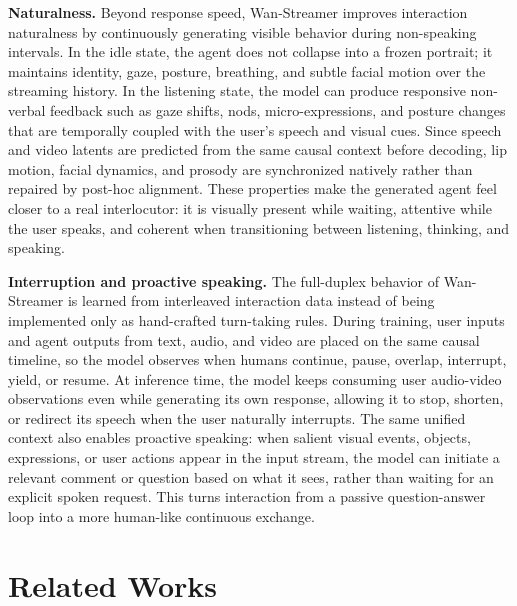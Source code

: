 \documentclass{llmxive}
\providecommand{\model}{Wan-Streamer\xspace}
\begin{document}
\textbf{Naturalness.}
Beyond response speed, \model improves interaction naturalness by continuously generating visible behavior during non-speaking intervals. In the idle state, the agent does not collapse into a frozen portrait; it maintains identity, gaze, posture, breathing, and subtle facial motion over the streaming history. In the listening state, the model can produce responsive non-verbal feedback such as gaze shifts, nods, micro-expressions, and posture changes that are temporally coupled with the user's speech and visual cues. Since speech and video latents are predicted from the same causal context before decoding, lip motion, facial dynamics, and prosody are synchronized natively rather than repaired by post-hoc alignment. These properties make the generated agent feel closer to a real interlocutor: it is visually present while waiting, attentive while the user speaks, and coherent when transitioning between listening, thinking, and speaking.

\textbf{Interruption and proactive speaking.}
The full-duplex behavior of \model is learned from interleaved interaction data instead of being implemented only as hand-crafted turn-taking rules. During training, user inputs and agent outputs from text, audio, and video are placed on the same causal timeline, so the model observes when humans continue, pause, overlap, interrupt, yield, or resume. At inference time, the model keeps consuming user audio-video observations even while generating its own response, allowing it to stop, shorten, or redirect its speech when the user naturally interrupts. The same unified context also enables proactive speaking: when salient visual events, objects, expressions, or user actions appear in the input stream, the model can initiate a relevant comment or question based on what it sees, rather than waiting for an explicit spoken request. This turns interaction from a passive question-answer loop into a more human-like continuous exchange.


\FloatBarrier


\section{Related Works}
\end{document}
